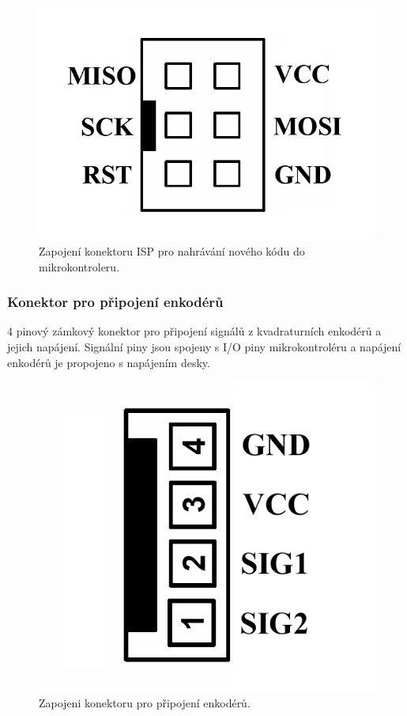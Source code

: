 \documentclass[a4paper,11pt]{article}
\begin{document}
\begin{figure}[htbp]
		\centering
			\includegraphics[scale=0.25]{KonektorISP.png}
		\caption{Zapojení konektoru ISP pro nahrávání nového kódu do mikrokontroleru.}
		\label{fig:KonektorISP}
	\end{figure}

\subsubsection{Konektor pro připojení enkodérů}
4 pinový zámkový konektor pro připojení signálů z kvadraturních enkodérů a jejich napájení. Signální piny jsou spojeny s I/O piny mikrokontroléru a napájení enkodérů je propojeno s napájením desky.

\begin{figure}[htbp]
		\centering
			\includegraphics[scale=0.25]{KonektorEnkoder.png}
		\caption{Zapojeni konektoru pro připojení enkodérů.}
		\label{fig:KonektorEnkoder}
	\end{figure}
\end{document}
